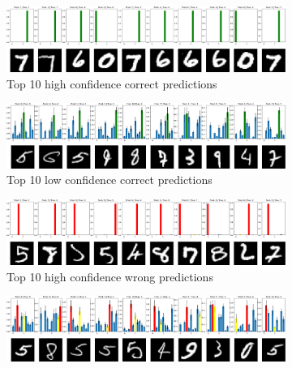 \begin{figure}[h]
     \centering
     \begin{subfigure}[b]{\textwidth}
         \centering
         \includegraphics[width=\textwidth]{observational/img/bnn/bnn_top_high_correct.png}
         \caption{Top 10 high confidence correct predictions}
     \end{subfigure}
     \par\bigskip
     \begin{subfigure}[b]{\textwidth}
         \centering
         \includegraphics[width=\textwidth]{observational/img/bnn/bnn_top_low_correct.png}
         \caption{Top 10 low confidence correct predictions}
     \end{subfigure}
     \par\bigskip
     \begin{subfigure}[b]{\textwidth}
         \centering
         \includegraphics[width=\textwidth]{observational/img/bnn/bnn_top_high_wrong.png}
         \caption{Top 10 high confidence wrong predictions}
     \end{subfigure}
     \par\bigskip
     \begin{subfigure}[b]{\textwidth}
         \centering
         \includegraphics[width=\textwidth]{observational/img/bnn/bnn_top_low_wrong.png}

\end{subfigure}
\end{figure}
